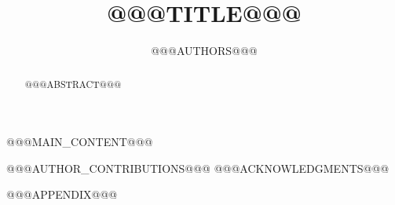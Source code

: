 \documentclass{article} %
\title{@@@TITLE@@@}
\author{@@@AUTHORS@@@}
\begin{document}
\maketitle

\begin{abstract}
@@@ABSTRACT@@@
\end{abstract}

@@@MAIN_CONTENT@@@

@@@AUTHOR_CONTRIBUTIONS@@@
@@@ACKNOWLEDGMENTS@@@




\appendix
@@@APPENDIX@@@
\end{document}
